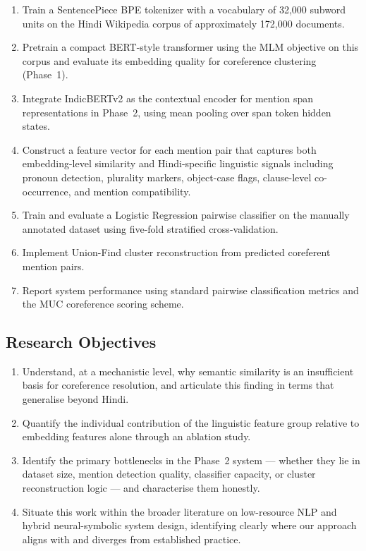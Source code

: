 \documentclass[12pt,a4paper]{report}
\begin{document}
\begin{enumerate}
    \item Train a SentencePiece BPE tokenizer with a vocabulary of 32,000 subword units on the Hindi Wikipedia corpus of approximately 172,000 documents.
    \item Pretrain a compact BERT-style transformer using the MLM objective on this corpus and evaluate its embedding quality for coreference clustering (Phase~1).
    \item Integrate IndicBERTv2 as the contextual encoder for mention span representations in Phase~2, using mean pooling over span token hidden states.
    \item Construct a feature vector for each mention pair that captures both embedding-level similarity and Hindi-specific linguistic signals including pronoun detection, plurality markers, object-case flags, clause-level co-occurrence, and mention compatibility.
    \item Train and evaluate a Logistic Regression pairwise classifier on the manually annotated dataset using five-fold stratified cross-validation.
    \item Implement Union-Find cluster reconstruction from predicted coreferent mention pairs.
    \item Report system performance using standard pairwise classification metrics and the MUC coreference scoring scheme.
\end{enumerate}

\subsection{Research Objectives}

\begin{enumerate}
    \item Understand, at a mechanistic level, why semantic similarity is an insufficient basis for coreference resolution, and articulate this finding in terms that generalise beyond Hindi.
    \item Quantify the individual contribution of the linguistic feature group relative to embedding features alone through an ablation study.
    \item Identify the primary bottlenecks in the Phase~2 system --- whether they lie in dataset size, mention detection quality, classifier capacity, or cluster reconstruction logic --- and characterise them honestly.
    \item Situate this work within the broader literature on low-resource NLP and hybrid neural-symbolic system design, identifying clearly where our approach aligns with and diverges from established practice.
\end{enumerate}
\end{document}
